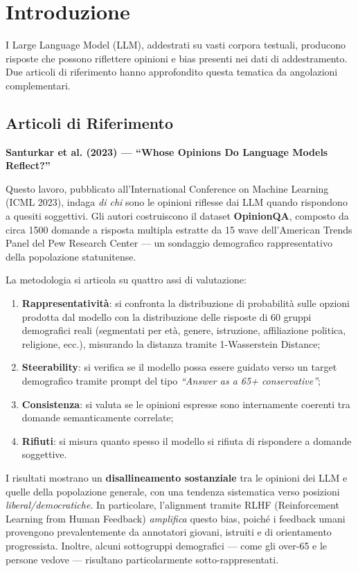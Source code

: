 \documentclass[../relazione.tex]{subfiles}
\begin{document}
\section{Introduzione}

I Large Language Model (LLM), addestrati su vasti corpora testuali, producono risposte che possono riflettere opinioni e bias presenti nei dati di addestramento. Due articoli di riferimento hanno approfondito questa tematica da angolazioni complementari.

\subsection*{Articoli di Riferimento}

\textbf{Santurkar et al. (2023) --- ``Whose Opinions Do Language Models Reflect?''} \cite{santurkar2023whose}

Questo lavoro, pubblicato all'International Conference on Machine Learning (ICML 2023), indaga \emph{di chi} sono le opinioni riflesse dai LLM quando rispondono a quesiti soggettivi. Gli autori costruiscono il dataset \textbf{OpinionQA}, composto da circa 1500 domande a risposta multipla estratte da 15 wave dell'American Trends Panel del Pew Research Center --- un sondaggio demografico rappresentativo della popolazione statunitense.

La metodologia si articola su quattro assi di valutazione:
\begin{enumerate}
    \item \textbf{Rappresentatività}: si confronta la distribuzione di probabilità sulle opzioni prodotta dal modello con la distribuzione delle risposte di 60 gruppi demografici reali (segmentati per età, genere, istruzione, affiliazione politica, religione, ecc.), misurando la distanza tramite 1-Wasserstein Distance;
    \item \textbf{Steerability}: si verifica se il modello possa essere guidato verso un target demografico tramite prompt del tipo \emph{``Answer as a 65+ conservative''};
    \item \textbf{Consistenza}: si valuta se le opinioni espresse sono internamente coerenti tra domande semanticamente correlate;
    \item \textbf{Rifiuti}: si misura quanto spesso il modello si rifiuta di rispondere a domande soggettive.
\end{enumerate}
I risultati mostrano un \textbf{disallineamento sostanziale} tra le opinioni dei LLM e quelle della popolazione generale, con una tendenza sistematica verso posizioni \emph{liberal/democratiche}. In particolare, l'alignment tramite RLHF (Reinforcement Learning from Human Feedback) \emph{amplifica} questo bias, poiché i feedback umani provengono prevalentemente da annotatori giovani, istruiti e di orientamento progressista. Inoltre, alcuni sottogruppi demografici --- come gli over-65 e le persone vedove --- risultano particolarmente sotto-rappresentati.
\end{document}
